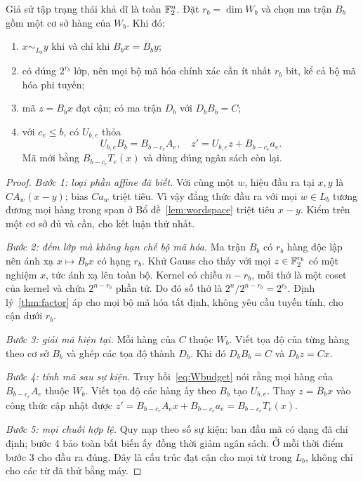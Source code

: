 \begin{theorem}\label{thm:linear}
Giả sử tập trạng thái khả dĩ là toàn $\mathbb F_2^n$. Đặt $r_b=\dim W_b$ và chọn ma trận $B_b$ gồm một cơ sở hàng của $W_b$. Khi đó:
\begin{enumerate}
\item $x\sim_{L_b}y$ khi và chỉ khi $B_bx=B_by$;
\item có đúng $2^{r_b}$ lớp, nên mọi bộ mã hóa chính xác cần ít nhất $r_b$ bit, kể cả bộ mã hóa phi tuyến;
\item mã $z=B_bx$ đạt cận; có ma trận $D_b$ với $D_bB_b=C$;
\item với $c_e\le b$, có $U_{b,e}$ thỏa
\[
U_{b,e}B_b=B_{b-c_e}A_e,
\quad z'=U_{b,e}z+B_{b-c_e}a_e.
\]
Mã mới bằng $B_{b-c_e}T_e(x)$ và dùng đúng ngân sách còn lại.
\end{enumerate}
\end{theorem}
\begin{proof}
\emph{Bước 1: loại phần affine đã biết.} Với cùng một $w$, hiệu đầu ra tại $x,y$ là $CA_w(x-y)$; bias $Ca_w$ triệt tiêu. Vì vậy đẳng thức đầu ra với mọi $w\in L_b$ tương đương mọi hàng trong span ở Bổ đề~\ref{lem:wordspace} triệt tiêu $x-y$. Kiểm trên một cơ sở đủ và cần, cho kết luận thứ nhất.

\emph{Bước 2: đếm lớp mà không hạn chế bộ mã hóa.} Ma trận $B_b$ có $r_b$ hàng độc lập nên ánh xạ $x\mapsto B_bx$ có hạng $r_b$. Khử Gauss cho thấy với mọi $z\in\mathbb F_2^{r_b}$ có một nghiệm $x$, tức ánh xạ lên toàn bộ. Kernel có chiều $n-r_b$, mỗi thớ là một coset của kernel và chứa $2^{n-r_b}$ phần tử. Do đó số thớ là $2^n/2^{n-r_b}=2^{r_b}$. Định lý~\ref{thm:factor} áp cho mọi bộ mã hóa tất định, không yêu cầu tuyến tính, cho cận dưới $r_b$.

\emph{Bước 3: giải mã hiện tại.} Mỗi hàng của $C$ thuộc $W_b$. Viết tọa độ của từng hàng theo cơ sở $B_b$ và ghép các tọa độ thành $D_b$. Khi đó $D_bB_b=C$ và $D_bz=Cx$.

\emph{Bước 4: tính mã sau sự kiện.} Truy hồi~\eqref{eq:Wbudget} nói rằng mọi hàng của $B_{b-c_e}A_e$ thuộc $W_b$. Viết tọa độ các hàng ấy theo $B_b$ tạo $U_{b,e}$. Thay $z=B_bx$ vào công thức cập nhật được
$z'=B_{b-c_e}A_ex+B_{b-c_e}a_e=B_{b-c_e}T_e(x)$.

\emph{Bước 5: mọi chuỗi hợp lệ.} Quy nạp theo số sự kiện: ban đầu mã có dạng đã chỉ định; bước 4 bảo toàn bất biến ấy đồng thời giảm ngân sách. Ở mỗi thời điểm bước 3 cho đầu ra đúng. Đây là cấu trúc đạt cận cho mọi từ trong $L_b$, không chỉ cho các từ đã thử bằng máy.
\end{proof}

